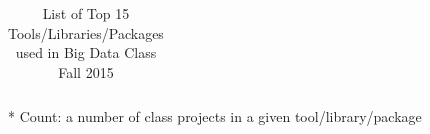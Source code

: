\documentclass[9pt,twocolumn,twoside]{styles/osajnl}
\begin{document}
\begin{table}[htb]
\begin{center}
\begin{small}
\begin{threeparttable}
\begin{tabular}{l|l|l|l|l}
        \end{tabular}
        \caption{List of Top 15 Tools/Libraries/Packages used in Big
          Data Class Fall 2015}
        \label{tab:tools-fa15}
        \begin{tablenotes}
        \item[*] Count: a number of class projects in a given tool/library/package
        \end{tablenotes}
      \end{threeparttable}
    \end{small}
  \end{center}
\end{table}



\begin{table}[htb]
  \begin{center}
    \begin{small}
      \begin{threeparttable}
        \begin{tabular}{l|l|l|l|l}


\end{tabular}
\end{threeparttable}
\end{small}
\end{center}
\end{table}
\end{document}
